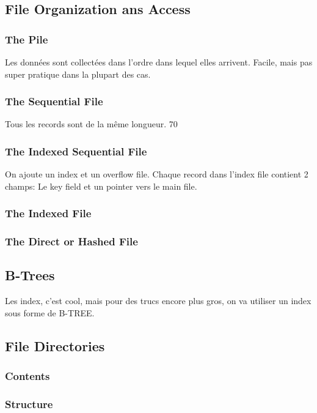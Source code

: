 \subsection{File Organization ans Access }
\subsubsection{The Pile}
Les données sont collectées dans l'ordre dans lequel elles arrivent.
Facile, mais pas super pratique dans la plupart des cas.

\subsubsection{The Sequential File}
Tous les records sont de la même longueur.
70

\subsubsection{The Indexed Sequential File}
On ajoute un index et un overflow file.
Chaque record dans l'index file contient 2 champs: Le key field et un pointer vers le main file.

\subsubsection{The Indexed File}

\subsubsection{The Direct or Hashed File}

\subsection{B-Trees}
Les index, c'est cool, mais pour des trucs encore plus gros, on va utiliser un index sous forme de B-TREE.

\subsection{File Directories}

\subsubsection{Contents}

\subsubsection{Structure}

